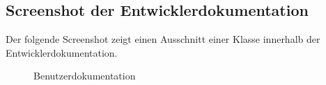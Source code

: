 \subsection{Screenshot der Entwicklerdokumentation}
\label{app:phpdoc}
Der folgende Screenshot zeigt einen Ausschnitt einer Klasse innerhalb der Entwicklerdokumentation.
\begin{figure}[htb]
\centering
{}
\caption{Benutzerdokumentation}
\end{figure}
\clearpage



